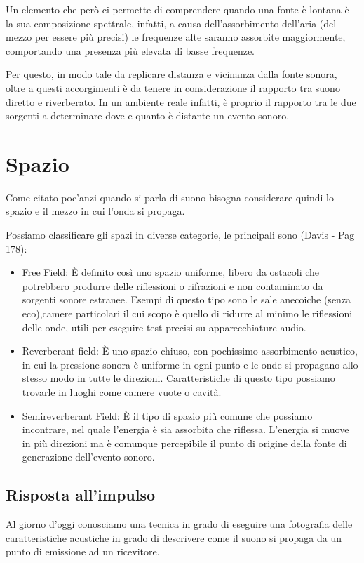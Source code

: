 Un elemento che però ci permette di comprendere quando una fonte è lontana è la sua composizione spettrale, infatti, a causa dell’assorbimento dell’aria (del mezzo per essere più precisi) le frequenze alte saranno assorbite maggiormente, comportando una presenza più elevata di basse frequenze.

Per questo, in modo tale da replicare distanza e vicinanza dalla fonte sonora, oltre a questi accorgimenti è da tenere in considerazione il rapporto tra suono diretto e riverberato.
In un ambiente reale infatti, è proprio il rapporto tra le due sorgenti a determinare dove e quanto è distante un evento sonoro.
\section{Spazio}
Come citato poc'anzi quando si parla di suono bisogna considerare quindi lo spazio e il mezzo in cui l'onda si propaga.

Possiamo classificare gli spazi in diverse categorie, le principali sono (Davis - Pag 178):
\begin{itemize}
\item Free Field:
È definito così uno spazio uniforme, libero da ostacoli che potrebbero produrre delle riflessioni o rifrazioni e non contaminato da sorgenti sonore estranee.
Esempi di questo tipo sono le sale anecoiche (senza eco),camere particolari il cui scopo è quello di ridurre al minimo le riflessioni delle onde, utili per eseguire test precisi su apparecchiature audio.
\item Reverberant field:
È uno spazio chiuso, con pochissimo assorbimento acustico, in cui la pressione sonora è uniforme in ogni punto e le onde si propagano allo stesso modo in tutte le direzioni.
Caratteristiche di questo tipo possiamo trovarle in luoghi come camere vuote o cavità.
\item Semireverberant Field:
È il tipo di spazio più comune che possiamo incontrare, nel quale l’energia è sia assorbita che riflessa. L’energia si muove in più direzioni ma è comunque percepibile il punto di origine della fonte di generazione dell’evento sonoro.
\end{itemize}
\subsection{Risposta all'impulso}
Al giorno d’oggi conosciamo una tecnica in grado di eseguire una fotografia delle caratteristiche acustiche in grado di descrivere come il suono si propaga da un punto di emissione ad un ricevitore. 

